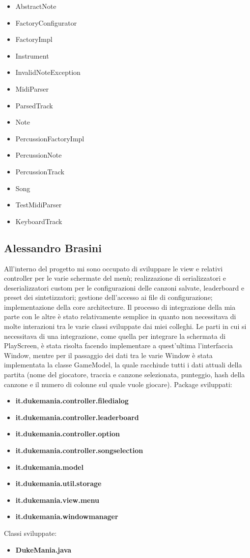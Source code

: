 \documentclass[a4paper,12pt]{report}
\begin{document}
{
\begin{itemize}
	\item AbstractNote
	\item FactoryConfigurator
	\item FactoryImpl
	\item Instrument
	\item InvalidNoteException
	\item MidiParser
	\item ParsedTrack
	\item Note
	\item PercussionFactoryImpl
	\item PercussionNote
	\item PercussionTrack
	\item Song
	\item TestMidiParser
	\item KeyboardTrack
\end{itemize}
}
\hfill\break
\newpage

\subsection{Alessandro Brasini}
All'interno del progetto mi sono occupato di sviluppare le view e relativi controller per le varie schermate del menù; realizzazione di serializzatori e 
deserializzatori custom per le configurazioni delle canzoni salvate, leaderboard e preset dei sintetizzatori; gestione dell'accesso ai file di configurazione;
implementazione della core architecture.
Il processo di integrazione della mia parte con le altre è stato relativamente semplice in quanto non necessitava di molte interazioni
tra le varie classi sviluppate dai miei colleghi. Le parti in cui si necessitava di una integrazione, come quella per integrare la schermata di PlayScreen,
è stata risolta facendo implementare a quest'ultima l'interfaccia Window, mentre per il passaggio dei dati tra le varie Window è stata implementata la 
classe GameModel, la quale racchiude tutti i dati attuali della partita (nome del giocatore, traccia e canzone selezionata, punteggio, hash della canzone e il numero di 
colonne sul quale vuole giocare).
Package sviluppati:
\begin{itemize}
	\item \textbf{it.dukemania.controller.filedialog}
	\item \textbf{it.dukemania.controller.leaderboard}
	\item \textbf{it.dukemania.controller.option}
	\item \textbf{it.dukemania.controller.songselection}
	\item \textbf{it.dukemania.model}
	\item \textbf{it.dukemania.util.storage}
	\item \textbf{it.dukemania.view.menu}
	\item \textbf{it.dukemania.windowmanager}
\end{itemize}
Classi sviluppate:
\begin{itemize}
	\item \textbf{DukeMania.java}
\end{itemize}
\newpage
\end{document}
